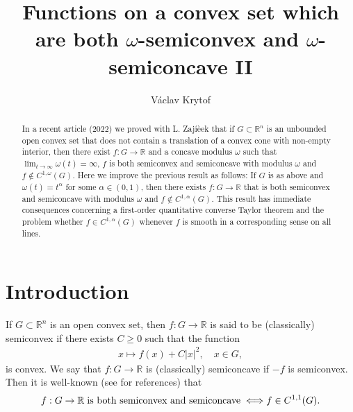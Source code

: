 \documentclass[10pt,a4paper]{amsart}
\theoremstyle{definition}
\newcommand{\R}{\mathbb{R}}
\begin{document}
\title{Functions on a convex set which are both $ \omega $-semiconvex and $ \omega $-semiconcave II}
\author{Václav Krytof}

\address{Charles University, Faculty of Mathematics and Physics, Sokolovská 83, 186 75 Praha 8, Karlí­n, Czech Republic}




\begin{abstract}
In a recent article (2022) we proved with L. Zajíèek that if $ G\subset\R^n $ is an unbounded open convex set that does not contain a translation of a convex cone with non-empty interior, then there exist $ f:G\to\R $ and a concave modulus $ \omega $ such that $ \lim_{t\to\infty}\omega(t)=\infty $, $ f $ is both semiconvex and semiconcave with modulus $ \omega $ and $ f\notin C^{1,\omega}(G) $. Here we improve the previous result as follows: If $ G $ is as above and $ \omega(t)=t^{\alpha} $ for some $ \alpha\in(0,1) $, then there exists $ f:G\to\R $ that is both semiconvex and semiconcave with modulus $ \omega $ and $ f\notin C^{1,\alpha}(G) $. This result has immediate consequences concerning a first-order quantitative converse Taylor theorem and the problem whether $ f\in C^{1,\alpha}(G) $ whenever $ f $ is smooth in a corresponding sense on all lines.
\end{abstract}

\maketitle




\section{Introduction}

If $ G\subset\R^n $ is an open convex set, then $ f:G\to\R $ is said to be (classically) semiconvex if there exists $ C\geq 0 $ such that the function
\begin{align*}
x\mapsto f(x)+C\vert x\vert^2,\quad x\in G,
\end{align*}
is convex. We say that $ f:G\to\R $ is (classically) semiconcave if $ -f $ is semiconvex. Then it is well-known (see \cite[Section 3]{KZ} for references) that
\begin{align}\label{eq_classic}
f:G\to\R\;\textnormal{is both semiconvex and semiconcave}\;\Longleftrightarrow f\in C^{1,1}(G).
\end{align}
\end{document}
